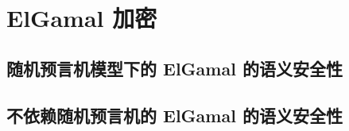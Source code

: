 \section{ElGamal 加密}\label{sec:11-5}

\begin{remark}[哈希$(v,w)$ vs. 只哈希 $w$]\label{remark:11-1}
	
\end{remark}

\subsection{随机预言机模型下的 ElGamal 的语义安全性}\label{subsec:11-5-1}

\begin{theorem}\label{theo:11-4}
	
\end{theorem}

\subsection{不依赖随机预言机的 ElGamal 的语义安全性}\label{subsec:11-5-2}

\begin{game}[安全的密钥派生]\label{game:11-3}
	
\end{game}

\begin{definition}[安全的密钥派生]\label{def:11-5}
	
\end{definition}

\begin{theorem}\label{theo:11-5}
	
\end{theorem}